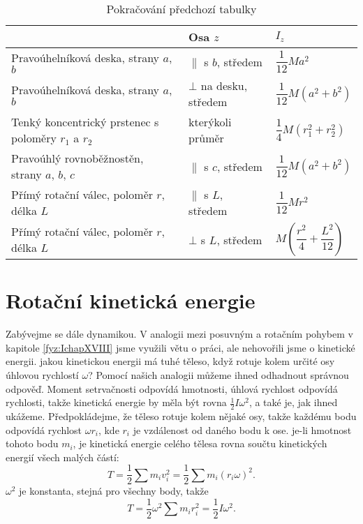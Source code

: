     \begin{table*}
      \centering
      \setlength{\tabcolsep}{2pt}
      \begin{tabular}{|l|l|l|}
        \hline
        \rowcolor{CornflowerBlue}{těleso} & {Osa \(z\)} & \(I_z\)                  \\
        \hline
        Pravoúhelníková deska, strany \(a\), \(b\)
          & \(\parallel\) s \(b\), středem & \(\dfrac{1}{12}Ma^2\)                 \\
        \hline 
        Pravoúhelníková deska, strany \(a\), \(b\)  
          & \(\bot\) na desku, středem & \(\dfrac{1}{12}M(a^2 + b^2)\)             \\
        \hline 
        Tenký koncentrický prstenec s poloměry \(r_1\) a \(r_2\)  
          &  kterýkoli průměr  & \(\dfrac{1}{4}M(r_1^2 + r_2^2)\)                  \\
        \hline 
        Pravoúhlý rovnoběžnostěn, strany \(a\), \(b\), \(c\)  
          & \(\parallel\) s \(c\), středem & \(\dfrac{1}{12}M(a^2 + b^2)\)         \\
        \hline 
        Přímý rotační válec, poloměr \(r\), délka \(L\) 
          & \(\parallel\) s \(L\), středem & \(\dfrac{1}{12}Mr^2\)                 \\
        \hline
        Přímý rotační válec, poloměr \(r\), délka \(L\) 
          & \(\bot\) s \(L\), středem & \(M\left(\dfrac{r^2}{4} + \dfrac{L^2}{12}\right)\)                                          \\
        \hline 
      \end{tabular}
      \caption{Pokračování předchozí tabulky}\label{fyz:tab014}
    \end{table*}

  \section{Rotační kinetická energie}\label{fyz:IchapXIXsecIV}
    Zabývejme se dále dynamikou. V analogii mezi posuvným a rotačním pohybem v kapitole
    \ref{fyz:IchapXVIII} jsme využili větu o práci, ale nehovořili jsme o kinetické energii. jakou
    kinetickou energii má tuhé těleso, když rotuje kolem určité osy úhlovou rychlostí \(\omega\)?
    Pomocí našich analogii můžeme ihned odhadnout správnou odpověď. Moment setrvačnosti odpovídá
    hmotnosti, úhlová rychlost odpovídá rychlosti, takže kinetická energie by měla být rovna
    \(\frac{1}{2}Iω^2\), a také je, jak ihned ukážeme. Předpokládejme, že těleso rotuje kolem nějaké
    osy, takže každému bodu odpovídá rychlost \(ωr_i\), kde \(r_i\) je vzdálenost od daného bodu k
    ose. je-li hmotnost tohoto bodu \(m_i\), je kinetická energie celého tělesa rovna součtu
    kinetických energií všech malých částí:
    \begin{equation*}
      T=\frac{1}{2}∑m_iv^2_i=\frac{1}{2}∑m_i(r_iω)^2.
    \end{equation*}
    \(ω^2\) je konstanta, stejná pro všechny body, takže
    \begin{equation}
      T=\frac{1}{2}ω^2∑m_ir^2_i=\frac{1}{2}Iω^2.
    \end{equation}

